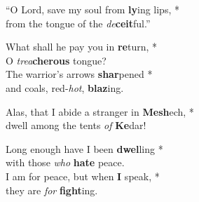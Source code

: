 ``O Lord, save my soul from \textbf{ly}ing lips, *\\
from the tongue of the \emph{de}\textbf{ceit}ful.''

What shall he pay you in \textbf{re}turn, *\\
O \emph{trea}\textbf{cherous} tongue?\\
The warrior's arrows \textbf{shar}pened *\\
and coals, red-\emph{hot}, \textbf{blaz}ing.

Alas, that I abide a stranger in \textbf{Mesh}ech, *\\
dwell among the tents \emph{of} \textbf{Ke}dar!

Long enough have I been \textbf{dwel}ling *\\
with those \emph{who} \textbf{hate} peace.\\
I am for peace, but when \textbf{I} speak, *\\
they are \emph{for} \textbf{fight}ing.